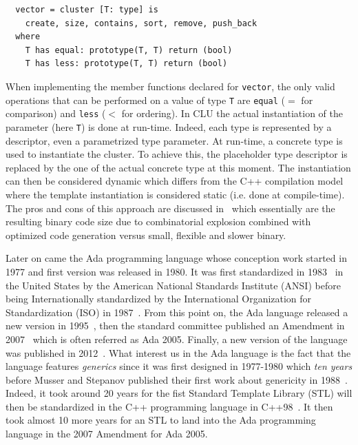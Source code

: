 \begin{verbatim}
  vector = cluster [T: type] is
    create, size, contains, sort, remove, push_back
  where
    T has equal: prototype(T, T) return (bool)
    T has less: prototype(T, T) return (bool)
\end{verbatim}

When implementing the member functions declared for \texttt{vector}, the only valid operations that can be performed on
a value of type \texttt{T} are \texttt{equal} ($=$ for comparison) and \texttt{less} ($<$ for ordering). In CLU the
actual instantiation of the parameter (here \texttt{T}) is done at run-time. Indeed, each type is represented by a
descriptor, even a parametrized type parameter. At run-time, a concrete type is used to instantiate the cluster. To
achieve this, the placeholder type descriptor is replaced by the one of the actual concrete type at this moment. The
instantiation can then be considered dynamic which differs from the C++ compilation model where the template
instantiation is considered static (i.e. done at compile-time). The pros and cons of this approach are discussed
in~\parencite{atkinson.1978.cluimpl} which essentially are the resulting binary code size due to combinatorial explosion
combined with optimized code generation versus small, flexible and slower binary.

Later on came the Ada programming language whose conception work started in 1977 and first version was released in 1980.
It was first standardized in 1983~\parencite{ansi.1983.ada} in the United States by the American National Standards
Institute (ANSI) before being Internationally standardized by the International Organization for Standardization (ISO)
in 1987~\parencite{iso.1987.ada}. From this point on, the Ada language released a new version in
1995~\parencite{iso.1995.ada, iso.1995.ada.corr}, then the standard committee published an Amendment in
2007~\parencite{iso.1995.ada.amend} which is often referred as Ada 2005. Finally, a new version of the language was
published in 2012~\parencite{iso.2012.ada,iso.2012.ada.corr}. What interest us in the Ada language is the fact that the
language features \emph{generics} since it was first designed in 1977-1980 which \emph{ten years} before Musser and
Stepanov published their first work about genericity in 1988~\parencite{musser.1988.generic}. Indeed, it took around 20
years for the fist Standard Template Library (STL) will then be standardized in the C++ programming language in
C++98~\parencite{iso.1998.cpp}. It then took almost 10 more years for an STL to land into the Ada programming language in
the 2007 Amendment for Ada 2005.

